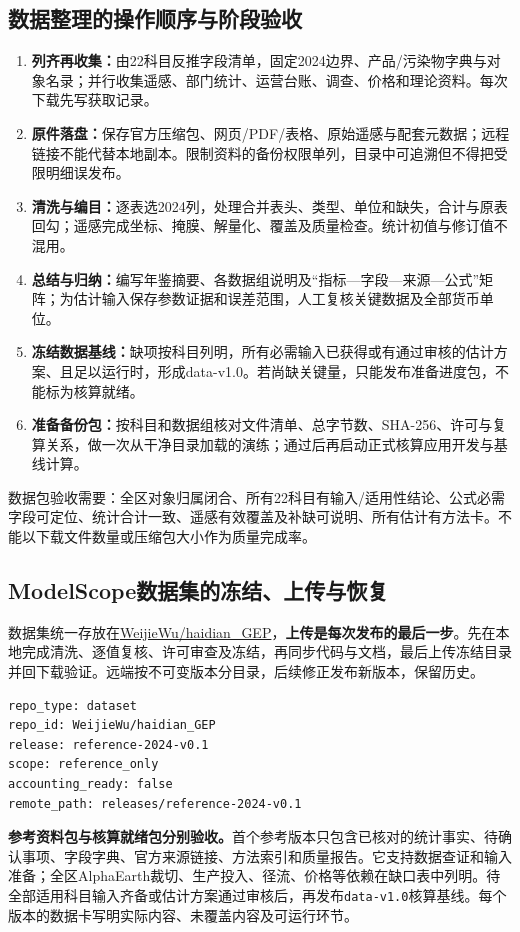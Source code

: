 \documentclass[12pt,a4paper,fontset=fandol]{ctexart}
\newcommand{\file}[1]{\nolinkurl{#1}}
\begin{document}
\subsection{数据整理的操作顺序与阶段验收}
\begin{enumerate}
\item \textbf{列齐再收集：}由22科目反推字段清单，固定2024边界、产品/污染物字典与对象名录；并行收集遥感、部门统计、运营台账、调查、价格和理论资料。每次下载先写获取记录。
\item \textbf{原件落盘：}保存官方压缩包、网页/PDF/表格、原始遥感与配套元数据；远程链接不能代替本地副本。限制资料的备份权限单列，目录中可追溯但不得把受限明细误发布。
\item \textbf{清洗与编目：}逐表选2024列，处理合并表头、类型、单位和缺失，合计与原表回勾；遥感完成坐标、掩膜、解量化、覆盖及质量检查。统计初值与修订值不混用。
\item \textbf{总结与归纳：}编写年鉴摘要、各数据组说明及“指标—字段—来源—公式”矩阵；为估计输入保存参数证据和误差范围，人工复核关键数据及全部货币单位。
\item \textbf{冻结数据基线：}缺项按科目列明，所有必需输入已获得或有通过审核的估计方案、且足以运行时，形成data-v1.0。若尚缺关键量，只能发布准备进度包，不能标为核算就绪。
\item \textbf{准备备份包：}按科目和数据组核对文件清单、总字节数、SHA-256、许可与复算关系，做一次从干净目录加载的演练；通过后再启动正式核算应用开发与基线计算。
\end{enumerate}
数据包验收需要：全区对象归属闭合、所有22科目有输入/适用性结论、公式必需字段可定位、统计合计一致、遥感有效覆盖及补缺可说明、所有估计有方法卡。不能以下载文件数量或压缩包大小作为质量完成率。

\subsection{ModelScope数据集的冻结、上传与恢复}
数据集统一存放在\href{https://modelscope.cn/datasets/WeijieWu/haidian_GEP}{WeijieWu/haidian\_GEP}，\textbf{上传是每次发布的最后一步}。先在本地完成清洗、逐值复核、许可审查及冻结，再同步代码与文档，最后上传冻结目录并回下载验证。远端按不可变版本分目录，后续修正发布新版本，保留历史。

\begin{lstlisting}
repo_type: dataset
repo_id: WeijieWu/haidian_GEP
release: reference-2024-v0.1
scope: reference_only
accounting_ready: false
remote_path: releases/reference-2024-v0.1
\end{lstlisting}
\textbf{参考资料包与核算就绪包分别验收。}首个参考版本只包含已核对的统计事实、待确认事项、字段字典、官方来源链接、方法索引和质量报告。它支持数据查证和输入准备；全区AlphaEarth裁切、生产投入、径流、价格等依赖在缺口表中列明。待全部适用科目输入齐备或估计方案通过审核后，再发布\file{data-v1.0}核算基线。每个版本的数据卡写明实际内容、未覆盖内容及可运行环节。
\end{document}
